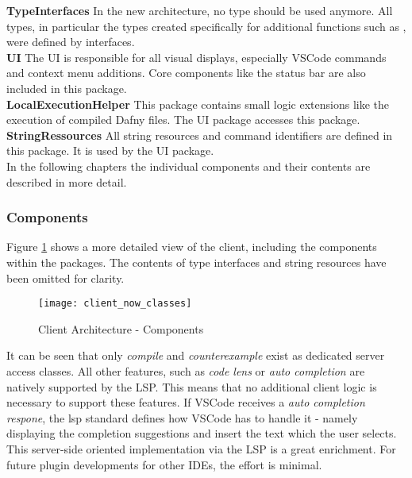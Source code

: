 {\bf TypeInterfaces} \textendash{}
In the new architecture, no  type should be used anymore. All types, in particular the types created specifically for additional functions such as , were defined by interfaces. \\

{\bf UI} \textendash{}
The UI is responsible for all visual displays, especially VSCode commands and context menu additions. Core components like the status bar are also included in this package. \\

{\bf LocalExecutionHelper} \textendash{}
This package contains small logic extensions like the execution of compiled Dafny files. The UI package accesses this package. \\

{\bf StringRessources} \textendash{}
All string resources and command identifiers are defined in this package. It is used by the UI package. \\

In the following chapters the individual components and their contents are described in more detail.

\subsubsection{Components}
Figure \ref{fig:client_now_classes} shows a more detailed view of the client, including the components within the packages. The contents of type interfaces and string resources have been omitted for clarity. \\

\begin{figure}[H]
    \centering
    \texttt{[image: client\_now\_classes]}
    \caption{Client Architecture - Components}
    \label{fig:client_now_classes}
\end{figure}

It can be seen that only \textit{compile} and \textit{counterexample} exist as dedicated server access classes. All other features, such as \textit{code lens} or \textit{auto completion} are natively supported by the LSP. This means that no additional client logic is necessary to support these features. If VSCode receives a \textit{auto completion respone}, the lsp standard defines how VSCode has to handle it - namely displaying the completion suggestions and insert the text which the user selects. This server-side oriented implementation via the LSP is a great enrichment. For future plugin developments for other IDEs, the effort is minimal.

